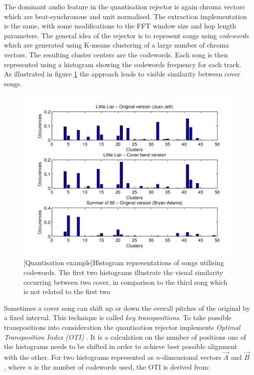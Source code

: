 The dominant audio feature in the quantisation rejector is again chroma vectors
which are beat-synchronous and unit normalised. The extraction implementation is
the same, with some modifications to the FFT window size and hop length
parameters. The general idea of the rejector is to represent songs using
\textit{codewords} which are generated using K-means clustering of a large
number of chroma vectors. The resulting cluster centers are the codewords. Each
song is then represented using a histogram showing the codewords frequency for
each track. As illustrated in figure \ref{fig:quantisation} the approach leads
to visible similarity between cover songs. 

\begin{figure}[H]
    \centering
    \includegraphics[width=\textwidth]{Algorithms/quantisation.png}
    [Quantisation example]{Histogram representations of songs utilising codewords. The first two histograms illustrate the visual similarity occurring between two cover, in comparison to the third song which is not related to the first two \cite{osmalskyj2013efficient}}
    \label{fig:quantisation}
\end{figure}

Sometimes a cover song can shift up or down the overall pitches of the original
by a fixed interval. This technique is called \textit{key transpositions}. To
take possible transpositions into consideration the quantisation rejector
implements \textit{Optimal Transposition Index (OTI)} \cite{serra2008audio}. It
is a calculation on the number of positions one of the histograms needs to be
shifted in order to achieve best possible alignment with the other. For two
histograms represented as $n$-dimensional vectors $\vec{A}$ and $\vec{B}$, where
$n$ is the number of codewords used, the OTI is derived from:

